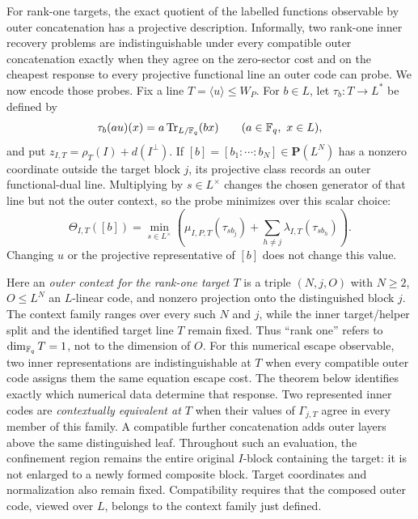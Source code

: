 For rank-one targets, the exact quotient of the labelled functions observable
by outer concatenation has a projective description.  Informally, two
rank-one inner recovery problems are indistinguishable under every compatible
outer concatenation exactly when they agree on the zero-sector cost and on the
cheapest response to every projective functional line an outer code can probe.
We now encode those probes.  Fix a line
$T=\langle u\rangle\leq W_P$.  For $b\in L$, let
$\tau_b:T\to L^*$ be defined by
\[
 \tau_b(au)(x)=a\operatorname{Tr}_{L/\mathbb F_q}(bx)
 \qquad(a\in\mathbb F_q,\ x\in L),
\]
and put $z_{I,T}=\rho_T(I)+d(I^\perp)$.  If
$[b]=[b_1:\cdots:b_N]\in\mathbf P(L^N)$ has a nonzero coordinate outside
the target block $j$, its projective class records an outer functional-dual
line.  Multiplying by $s\in L^\times$ changes the chosen generator of that
line but not the outer context, so the probe minimizes over this scalar choice:
\begin{equation}
 \Theta_{I,T}([b])=
 \min_{s\in L^\times}
 \left(
  \mu_{I,P,T}(\tau_{sb_j})+
  \sum_{h\ne j}\lambda_{I,T}(\tau_{sb_h})
 \right).
 \label{eq:rank-one-line-probe}
\end{equation}
Changing $u$ or the projective representative of $[b]$ does not change this
value.

Here an \emph{outer context for the rank-one target $T$} is a triple $(N,j,O)$ with $N\geq2$,
$O\leq L^N$ an $L$-linear code, and nonzero projection onto the distinguished
block $j$.  The context family ranges over every such $N$ and $j$, while the
inner target/helper split and the identified target line $T$ remain fixed.
Thus ``rank one'' refers to $\dim_{\mathbb F_q}T=1$, not to the dimension of $O$.
For this numerical escape observable, two inner representations are
indistinguishable at $T$ when every compatible outer code assigns them the
same equation escape cost.
The theorem below identifies exactly which numerical data determine that
response.
Two represented inner codes are \emph{contextually equivalent at $T$} when
their values of $\Gamma_{j,T}$ agree in every member of this family.  A
compatible further concatenation adds outer layers above the same
distinguished leaf.  Throughout such an evaluation, the confinement region
remains the entire original $I$-block containing the target: it is not enlarged
to a newly formed composite block.  Target coordinates and normalization also
remain fixed.  Compatibility requires that the composed outer code, viewed
over $L$, belongs to the context family just defined.

